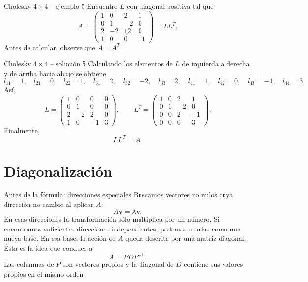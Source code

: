 \documentclass[aspectratio=169,10pt]{beamer}
\begin{document}
\begin{frame}{Cholesky $4\times 4$ -- ejemplo 5}
\small
Encuentre $L$ con diagonal positiva tal que
\[
A=\begin{pmatrix}1 & 0 & 2 & 1\\0 & 1 & -2 & 0\\2 & -2 & 12 & 0\\1 & 0 & 0 & 11\end{pmatrix}=LL^T.
\]
Antes de calcular, observe que $A=A^T$.
\end{frame}
\begin{frame}{Cholesky $4\times 4$ -- solución 5}
\small
Calculando los elementos de $L$ de izquierda a derecha y de arriba hacia abajo se obtiene
\[
l_{11}=1,\quad l_{21}=0,\quad l_{22}=1,\quad l_{31}=2,\quad l_{32}=-2,\quad l_{33}=2,\quad l_{41}=1,\quad l_{42}=0,\quad l_{43}=-1,\quad l_{44}=3.
\]
Así,
\[
L=\begin{pmatrix}1 & 0 & 0 & 0\\0 & 1 & 0 & 0\\2 & -2 & 2 & 0\\1 & 0 & -1 & 3\end{pmatrix},\qquad L^T=\begin{pmatrix}1 & 0 & 2 & 1\\0 & 1 & -2 & 0\\0 & 0 & 2 & -1\\0 & 0 & 0 & 3\end{pmatrix}.
\]
Finalmente,
\[
\boxed{LL^T=A}.
\]
\end{frame}
\section{Diagonalización}
\begin{frame}{Antes de la fórmula: direcciones especiales}
\small
Buscamos vectores no nulos cuya dirección no cambie al aplicar $A$:
\[
A\mathbf v=\lambda\mathbf v.
\]
En esas direcciones la transformación sólo multiplica por un número. Si encontramos suficientes direcciones independientes, podemos usarlas como una nueva base.
\medskip
En esa base, la acción de $A$ queda descrita por una matriz diagonal. Ésta es la idea que conduce a
\[
\boxed{A=PDP^{-1}}.
\]
Las columnas de $P$ son vectores propios y la diagonal de $D$ contiene sus valores propios en el mismo orden.
\end{frame}
\end{document}
